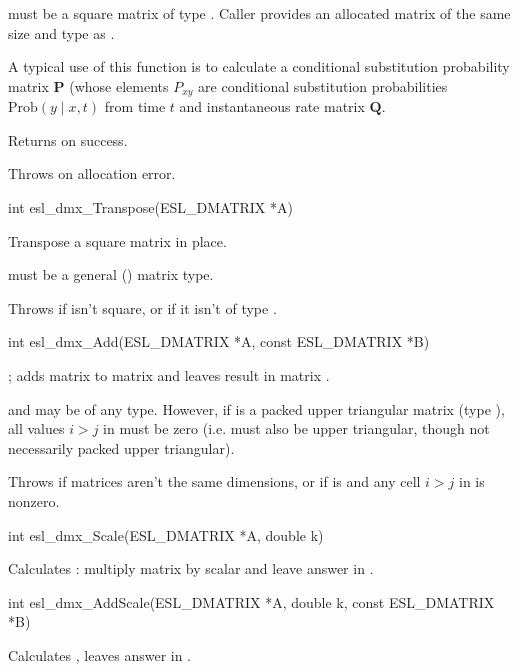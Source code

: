 \begin{sreapi}
 must be a square matrix of type .
Caller provides an allocated  matrix of the same size and type as .

A typical use of this function is to calculate a
conditional substitution probability matrix $\mathbf{P}$
(whose elements $P_{xy}$ are conditional substitution
probabilities $\mathrm{Prob}(y \mid x, t)$ from time $t$
and instantaneous rate matrix $\mathbf{Q}$.

Returns  on success.

Throws  on allocation error.



\hypertarget{func:esl_dmx_Transpose()}
{\item[int esl\_dmx\_Transpose(ESL\_DMATRIX *A)]}

Transpose a square matrix  in place.

 must be a general () matrix type.

Throws  if  isn't square, or if it isn't
of type .


\hypertarget{func:esl_dmx_Add()}
{\item[int esl\_dmx\_Add(ESL\_DMATRIX *A, const ESL\_DMATRIX *B)]}

; adds matrix  to matrix  and leaves result
in matrix .

 and  may be of any type. However, if  is a
packed upper triangular matrix (type
), all values $i>j$ in  must be
zero (i.e.  must also be upper triangular, though
not necessarily packed upper triangular).

Throws  if matrices aren't the same dimensions, or
if  is  and any cell $i>j$ in
 is nonzero.


\hypertarget{func:esl_dmx_Scale()}
{\item[int esl\_dmx\_Scale(ESL\_DMATRIX *A, double k)]}

Calculates : multiply matrix  by scalar
 and leave answer in .


\hypertarget{func:esl_dmx_AddScale()}
{\item[int esl\_dmx\_AddScale(ESL\_DMATRIX *A, double k, const ESL\_DMATRIX *B)]}

Calculates , leaves answer in .


\end{sreapi}
